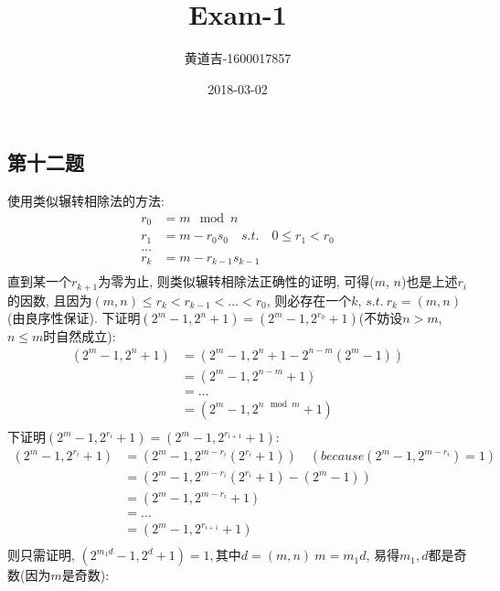 \documentclass{article}
\title{Exam-1}
\date{2018-03-02}
\author{
  \begin{CJK}{UTF8}{gbsn}
    黄道吉-1600017857
  \end{CJK}
}
\begin{document}
\begin{CJK}{UTF8}{gbsn}
\section{第十二题}
  使用类似辗转相除法的方法:
  \begin{equation*}
    \begin{aligned}
      r_0 &= m \mod n \\
      r_1 &= m - r_0s_0\quad  s.t.\quad 0 \leq r_1 < r_0 \\
      \dots & \\
      r_k &= m - r_{k - 1}s_{k - 1} \\
    \end{aligned}
  \end{equation*}
  直到某一个$r_{k + 1}$为零为止, 则类似辗转相除法正确性的证明, 可得($m$, $n$)也是上述$r_i$的因数, 且因为$(m, n) \leq r_k < r_{k - 1} < \dots < r_0$, 则必存在一个$k$, $s.t.\ r_k = (m, n)$(由良序性保证).
  \newline
  下证明$(2^m - 1, 2^n + 1) = (2^m - 1, 2^{r_0} + 1)$(不妨设$n > m$, $n \leq m$时自然成立):
  \begin{equation*}
    \begin{aligned}
      (2^m - 1, 2^n + 1) &= (2^m - 1, 2^n + 1 - 2^{n - m}(2^m - 1)) \\
      &= (2^m - 1, 2^{n - m} + 1) \\
      &= \dots \\
      &= (2^m - 1, 2^{n \mod m} + 1) \\
    \end{aligned}
  \end{equation*}
  \newline
  下证明$(2^m - 1, 2^{r_i} + 1) = (2^m - 1, 2^{r_{i + 1}} + 1)$:
  \begin{equation*}
    \begin{aligned}
      (2^m - 1, 2^{r_i} + 1) &= (2^m - 1, 2^{m - r_i}(2^{r_i} + 1)) \quad (because (2^m - 1, 2^{m - r_i}) = 1) \\
      &= (2^m - 1, 2^{m - r_i}(2^{r_i} + 1) - (2^m - 1)) \\
      &= (2^m - 1, 2^{m - r_i} + 1) \\
      &= \dots \\
      &= (2^m - 1, 2^{r_{i + 1}} + 1) \\
    \end{aligned}
  \end{equation*}
  则只需证明, $(2^{m_1d} - 1, 2^d + 1) = 1, $其中$d = (m, n)\ m = m_1d$, 易得$m_1, d$都是奇数(因为$m$是奇数):

\end{CJK}
\end{document}
